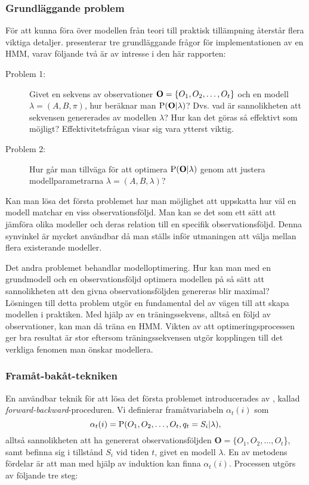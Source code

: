 \documentclass[../rapport_MVEX01-11-05]{subfiles}
\begin{document}
\subsubsection{Grundläggande problem}
För att kunna föra över modellen från teori till praktisk tillämpning
återstår flera viktiga detaljer.  presenterar
tre grundläggande frågor för implementationen av en HMM, varav följande
två är av intresse i den här rapporten:
\begin{description}
\item[Problem 1:] Givet en sekvens av observationer
  $\mathbf{O}=\{O_1,O_2,\dots,O_t\}$ och en modell $\lambda = (A,B,\pi)$, hur
  beräknar man $\mathrm{P}(\mathbf{O}|\lambda)$? Dvs. vad är sannolikheten att
  sekvensen genererades av modellen $\lambda$? Hur kan
  det göras så effektivt som möjligt? Effektivitetsfrågan visar sig
  vara ytterst viktig. 
\item[Problem 2:] Hur går man tillväga för att optimera
  $\mathrm{P}(\mathbf{O}|\lambda)$ genom att justera
  modellparametrarna $\lambda = (A,B,\lambda)$? 
\end{description}

Kan man lösa det första problemet har man möjlighet att uppskatta hur
väl en modell matchar en viss observationsföljd. Man kan se det som
ett sätt att jämföra olika modeller och
deras relation till en specifik observationsföljd. Denna synvinkel är
mycket användbar då man ställs inför utmaningen att välja mellan
flera existerande modeller. 

Det andra problemet behandlar modelloptimering. Hur kan man med en
grundmodell och en observationsföljd optimera modellen på så sätt att
sannolikheten att den givna observationsföljden genereras blir
maximal? Lösningen till detta problem utgör en fundamental del av
vägen till att skapa modellen i 
praktiken. Med hjälp av en träningssekvens, alltså en följd av
observationer, kan man då träna en HMM. Vikten av att
optimeringsprocessen ger bra resultat är stor eftersom
träningssekvensen utgör kopplingen till det verkliga fenomen
man önskar modellera.      

\subsubsection{Framåt-bakåt-tekniken}

En användbar teknik för att lösa det första problemet introducerades av , kallad
\emph{forward-backward}-proceduren. Vi
definierar framåtvariabeln $\alpha_t(i)$ som 
\begin{equation*}
\alpha_t(i) = \mathrm{P}(O_1,O_2,\dots,O_t,q_t = S_i | \lambda),
\end{equation*}
alltså sannolikheten att ha genererat observationsföljden $\textbf{O}
= \{O_1,O_2,\dots,O_t$\}, samt befinna sig i tillstånd $S_i$ vid tiden
$t$, givet en modell $\lambda$. En av metodens fördelar är att man med
hjälp av induktion kan finna $\alpha_t(i)$. Processen utgörs av
följande tre steg: 
\end{document}
